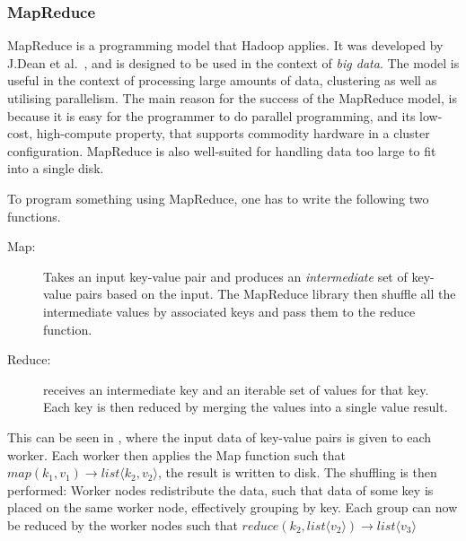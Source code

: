 \subsubsection{MapReduce}\label{sec:mapreduce_programming_model}
MapReduce is a programming model that Hadoop applies. It was developed by J.\@ Dean et al.~\cite{DeanMapReduce}, and is designed to be used in the context of \emph{big data}. The model is useful in the context of processing large amounts of data, clustering as well as utilising parallelism. The main reason for the success of the MapReduce model, is because it is easy for the programmer to do parallel programming, and its low-cost, high-compute property, that supports commodity hardware in a cluster configuration. MapReduce is also well-suited for handling data too large to fit into a single disk.

To program something using MapReduce, one has to write the following two functions. 
\begin{description}
\item[Map:] Takes an input key-value pair and produces an \emph{intermediate} set of key-value pairs based on the input. The MapReduce library then shuffle all the intermediate values by associated keys and pass them to the reduce function. 

\item[Reduce:] receives an intermediate key and an iterable set of values for that key. Each key is then reduced by merging the values into a single value result.
\end{description}

This can be seen in , where the input data of key-value pairs is given to each worker. Each worker then applies the Map function such that $map(k_1,v_1)\rightarrow list\langle k_2,v_2\rangle$, the result is written to disk. The shuffling is then performed: Worker nodes redistribute the data, such that data of some key is placed on the same worker node, effectively grouping by key. Each group can now be reduced by the worker nodes such that $reduce(k_2, list\langle v_2\rangle) \rightarrow list\langle v_3 \rangle$ 


